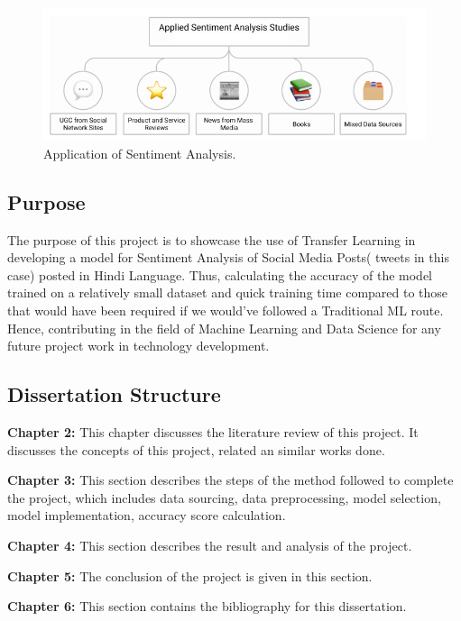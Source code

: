 \documentclass[a4paper, 12pt]{article}
\begin{document}
\begin{sloppypar}
\begin{figure}[H]
\begin{center}
\includegraphics[scale=0.7]{cat.png}
\caption{Application of Sentiment Analysis. \label{cat}} %
\end{center}
\end{figure}

\subsection{Purpose}

The purpose of this project is to showcase the use of Transfer Learning in developing a model for Sentiment Analysis of Social Media Posts( tweets in this case) posted in Hindi Language. Thus, calculating the accuracy of the model trained on a relatively small dataset and quick training time compared to those that would have been required if we would've followed a Traditional ML route. Hence, contributing in the field of Machine Learning and Data Science for any future project work in technology development.

\subsection{Dissertation Structure}
\textbf{Chapter 2:} This chapter discusses the literature review of this project. It discusses the concepts of this project, related an similar works done.

\textbf{Chapter 3:} This section describes the steps of the method followed to complete the project, which includes data sourcing, data preprocessing, model selection, model implementation, accuracy score calculation.

\textbf{Chapter 4:} This section describes the result and analysis of the project.

\textbf{Chapter 5:} The conclusion of the project is given in this section.

\textbf{Chapter 6:} This section contains the bibliography for this dissertation.
\clearpage


\end{sloppypar}
\end{document}
